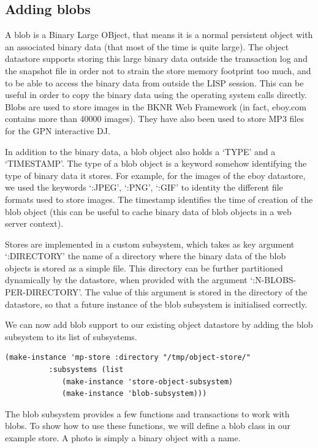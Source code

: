 \subsection{ Adding blobs}
A blob is a Binary Large OBject, that means it is a normal
persistent object with an associated binary data (that most of the
time is quite large). The object datastore supports storing this
large binary data outside the transaction log and the snapshot
file in order not to strain the store memory footprint too much,
and to be able to access the binary data from outside the LISP
session. This can be useful in order to copy the binary data using
the operating system calls directly. Blobs are used to store
images in the BKNR Web Framework (in fact, eboy.com contains more
than 40000 images). They have also been used to store MP3 files
for the GPN interactive DJ.

In addition to the binary data, a blob object also holds a `TYPE'
and a `TIMESTAMP'. The type of a blob object is a keyword somehow
identifying the type of binary data it stores. For example, for
the images of the eboy datastore, we used the keywords `:JPEG',
`:PNG', `:GIF' to identity the different file formats used to
store images. The timestamp identifies the time of creation of the
blob object (this can be useful to cache binary data of blob
objects in a web server context).

Stores are implemented in a custom subsystem, which takes as key
argument `:DIRECTORY' the name of a directory where the binary
data of the blob objects is stored as a simple file. This
directory can be further partitioned dynamically by the datastore,
when provided with the argument `:N-BLOBS-PER-DIRECTORY'. The
value of this argument is stored in the directory of the
datastore, so that a future instance of the blob subsystem is
initialised correctly.

We can now add blob support to our existing object datastore by
adding the blob subsystem to its list of subsystems.

\begin{Verbatim}[fontsize=\small,frame=leftline,framerule=0.9mm,rulecolor=\color{gray},framesep=5.1mm,xleftmargin=5mm,fontfamily=cmtt]
(make-instance 'mp-store :directory "/tmp/object-store/"
          :subsystems (list
             (make-instance 'store-object-subsystem)
             (make-instance 'blob-subsystem)))
\end{Verbatim}
The blob subsystem provides a few functions and transactions to
work with blobs. To show how to use these functions, we will
define a blob class in our example store. A photo is simply a
binary object with a name.

